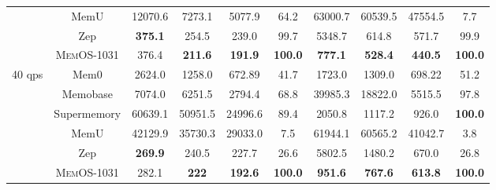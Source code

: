 \begin{table}[ht]
{\begin{tabular}{l|c|cccc|cccc}
                        & MemU          & 12070.6               & 7273.1                & 5077.9                        & 64.2                              & 63000.7               & 60539.5               & 47554.5                       & 7.7   \\
                        & Zep           & \textbf{375.1}        & 254.5                 & 239.0                         & 99.7                              & 5348.7                & 614.8                 & 571.7                         & 99.9  \\
                        & \cellcolor[HTML]{EFEFEF}\textsc{MemOS-1031}    & \cellcolor[HTML]{EFEFEF}376.4                 & \cellcolor[HTML]{EFEFEF}\textbf{211.6}        & \cellcolor[HTML]{EFEFEF}\textbf{191.9}                & \cellcolor[HTML]{EFEFEF}\textbf{100.0}                    & \cellcolor[HTML]{EFEFEF}\textbf{777.1}        & \cellcolor[HTML]{EFEFEF}\textbf{528.4}        & \cellcolor[HTML]{EFEFEF}\textbf{440.5}                & \cellcolor[HTML]{EFEFEF}\textbf{100.0}   \\ \hline
\multirow{6}{*}{40 qps} & Mem0          & 2624.0                & 1258.0                & 672.89                        & 41.7                              & 1723.0                & 1309.0                & 698.22                        & 51.2  \\
                        & Memobase      & 7074.0                & 6251.5                & 2794.4                        & 68.8                              & 39985.3               & 18822.0               & 5515.5                        & 97.8  \\
                        & Supermemory   & 60639.1               & 50951.5               & 24996.6                       & 89.4                              & 2050.8                & 1117.2                & 926.0                         & \textbf{100.0} \\
                        & MemU          & 42129.9               & 35730.3               & 29033.0                       & 7.5                               & 61944.1               & 60565.2               & 41042.7                       & 3.8   \\
                        & Zep           & \textbf{269.9}        & 240.5                 & 227.7                         & 26.6                              & 5802.5                & 1480.2                & 670.0                         & 26.8  \\
                        & \cellcolor[HTML]{EFEFEF}\textsc{MemOS-1031}    & \cellcolor[HTML]{EFEFEF}282.1                 & \cellcolor[HTML]{EFEFEF}\textbf{222}          & \cellcolor[HTML]{EFEFEF}\textbf{192.6}                & \cellcolor[HTML]{EFEFEF}\textbf{100.0}                      & \cellcolor[HTML]{EFEFEF}\textbf{951.6}        & \cellcolor[HTML]{EFEFEF}\textbf{767.6}        & \cellcolor[HTML]{EFEFEF}\textbf{613.8}                & \cellcolor[HTML]{EFEFEF}\textbf{100.0} \\ \hline

\end{tabular}}
\end{table}
